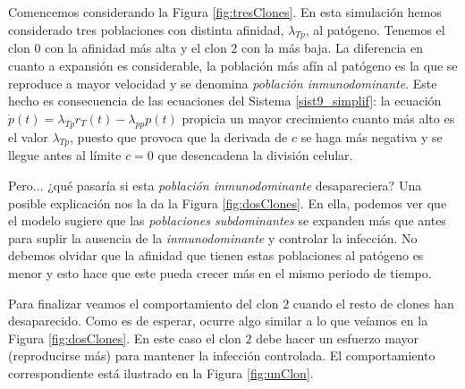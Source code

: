 Comencemos considerando la Figura \ref{fig:tresClones}. En esta simulación hemos considerado tres poblaciones con distinta afinidad, $\lambda_{Tp}$, al patógeno. Tenemos el clon $0$ con la afinidad más alta y el clon $2$ con la más baja. La diferencia en cuanto a expansión es considerable, la población más afín al patógeno es la que se reproduce a mayor velocidad y se denomina \textit{población inmunodominante}. Este hecho es consecuencia de las ecuaciones del Sistema \ref{sist9_simplif}: la ecuación $\dot{p}(t) = \lambda_{Tp}r_{T}(t) - \lambda_{pp}p(t)$ propicia un mayor crecimiento cuanto más alto es el valor $\lambda_{Tp}$, puesto que provoca que la derivada de $c$ se haga más negativa y se llegue antes al límite $c = 0$ que desencadena la división celular.



Pero... ¿qué pasaría si esta \textit{población inmunodominante} desapareciera? Una posible explicación nos la da la Figura \ref{fig:dosClones}. En ella, podemos ver que el modelo sugiere que las \textit{poblaciones subdominantes} se expanden más que antes para suplir la ausencia de la \textit{inmunodominante} y controlar la infección. No debemos olvidar que la afinidad que tienen estas poblaciones al patógeno es menor y esto hace que este pueda crecer más en el mismo periodo de tiempo.



Para finalizar veamos el comportamiento del clon $2$ cuando el resto de clones han desaparecido. Como es de esperar, ocurre algo similar a lo que veíamos en la Figura \ref{fig:dosClones}. En este caso el clon $2$ debe hacer un esfuerzo mayor (reproducirse más) para mantener la infección controlada. El comportamiento correspondiente está ilustrado en la Figura \ref{fig:unClon}.

